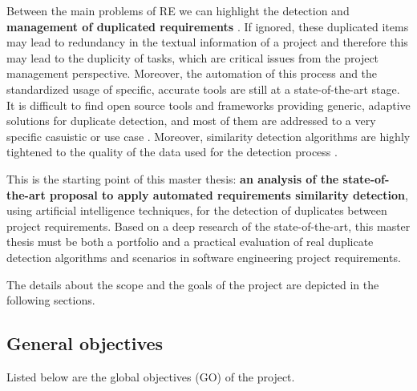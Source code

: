 \documentclass[11pt]{article}
\begin{document}
Between the main problems of RE we can highlight the detection and \textbf{management of duplicated requirements} \cite{b4}. If ignored, these duplicated items may lead to redundancy in the textual information of a project and therefore this may lead to the duplicity of tasks, which are critical issues from the project management perspective. Moreover, the automation of this process and the standardized usage of specific, accurate tools are still at a state-of-the-art stage. It is difficult to find open source tools and frameworks providing generic, adaptive solutions for duplicate detection, and most of them are addressed to a very specific casuistic or use case \cite{b5}. Moreover, similarity detection algorithms are highly tightened to the quality of the data used for the detection process \cite{b6}.

This is the starting point of this master thesis: \textbf{an analysis of the state-of-the-art proposal to apply automated requirements similarity detection}, using artificial intelligence techniques, for the detection of duplicates between project requirements. Based on a deep research of the state-of-the-art, this master thesis must be both a portfolio and a practical evaluation of real duplicate detection algorithms and scenarios in software engineering project requirements. 

The details about the scope and the goals of the project are depicted in the following sections.

\subsection{General objectives}
\label{sec:main_objectives}

Listed below are the global objectives (GO) of the project.
\end{document}
